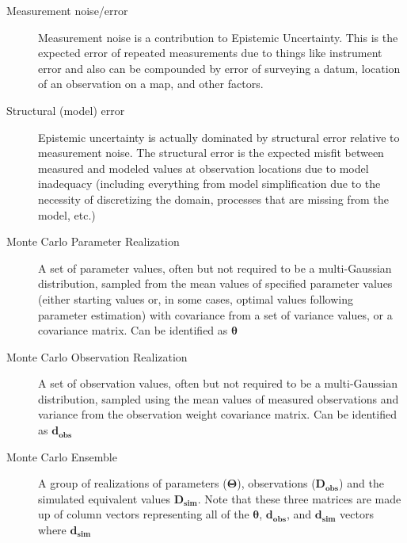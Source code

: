 \documentclass[english]{article}
\begin{document}
\begin{description}
\item [Measurement noise/error] Measurement noise is a contribution to Epistemic Uncertainty. This is the expected error of repeated measurements due to things like instrument error and also can be compounded by error of surveying a datum, location of an observation on a map, and other factors. 
\item [Structural (model) error] Epistemic uncertainty is actually dominated by structural error relative to measurement noise. The structural error is the expected misfit between measured and modeled values at observation locations due to model inadequacy (including everything from model simplification due to the necessity of discretizing the domain, processes that are missing from the model, etc.)
\item [Monte Carlo Parameter Realization] A set of parameter values, often but not required to be a multi-Gaussian distribution, sampled from the mean values of specified parameter values (either starting values or, in some cases, optimal values following parameter estimation) with covariance from a set of variance values, or a covariance matrix. Can be identified as $\mathbf{\theta}$ 
\item [Monte Carlo Observation Realization] A set of observation values, often but not required to be a multi-Gaussian distribution, sampled using the mean values of measured observations and variance from the observation weight covariance matrix. Can be identified as $\boldsymbol{d_{obs}}$

\item [Monte Carlo Ensemble] A group of realizations of parameters ($\mathbf{\Theta}$), observations ($\mathbf{D_{obs}}$) and the simulated equivalent values $\mathbf{D_{sim}}$. Note that these three matrices are made up of column vectors representing all of the $\boldsymbol{\theta}$, $\mathbf{d_{obs}}$, and  $\mathbf{d_{sim}}$ vectors where $\mathbf{d_{sim}}$ 


\end{description}
\end{document}

